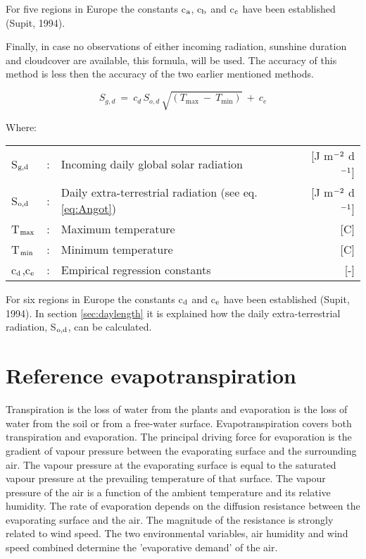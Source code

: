 For five regions in Europe the constants c$_{{\rm a}}$, c$_{{\rm b}}$ and c$_{{\rm c}}$ 
have been established (Supit, 1994).

Finally, in case no observations of either incoming radiation, sunshine duration and
cloudcover are available, this formula, will be used. The accuracy of this method is less
then the accuracy of the two earlier mentioned methods.

\begin{equation}
S _{g,d} ~=~ c _{d} \, S _{o,d} \, \sqrt{(T _{\max} ~-~T _{\min} )} ~+~c _{e} 
\end{equation}

Where:\\[5pt]
\begin{tabularx}{\textwidth}{llXr}
	S$_{{\rm g,d}}$ &:& Incoming daily global solar radiation  & [J m$^{{\rm -2}}$ d$^{{\rm -1}}$]\\
	S$_{{\rm o,d}}$ &:& Daily extra-terrestrial radiation (see eq. \ref{eq:Angot})  & 
	[J m$^{{\rm -2}}$ d$^{{\rm -1}}$]\\
	T$_{{\rm max}}$ &:& Maximum temperature  & [\textdegree C]\\
	T$_{{\rm min}}$ &:& Minimum temperature  & [\textdegree C]\\
	c$_{{\rm d}}$,c$_{{\rm e}}$  &:& Empirical regression constants  & [-]\\
\end{tabularx}

For six regions in Europe the constants c$_{{\rm d}}$ and c$_{{\rm e}}$ have been 
established (Supit, 1994). In section \ref{sec:daylength} it is explained how the 
daily extra-terrestrial radiation, S$_{{\rm o,d}}$, can be calculated.

\section{Reference evapotranspiration}

Transpiration is the loss of water from the plants and evaporation is the
loss of water from the soil or from a free-water surface. Evapotranspiration covers both
transpiration and evaporation.
The principal driving force for evaporation is the gradient of vapour pressure between the
evaporating surface and the surrounding air. The vapour pressure at the evaporating
surface is equal to the saturated vapour pressure at the prevailing temperature of that
surface. The vapour pressure of the air is a function of the ambient temperature and its
relative humidity. The rate of evaporation depends on the diffusion resistance between the
evaporating surface and the air.
The magnitude of the resistance is strongly related to wind speed. The two environ\-mental
variables, air humidity and wind speed combined determine the 'evaporative demand' of
the air.

